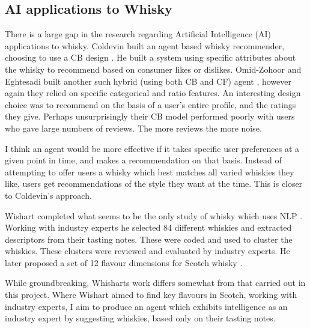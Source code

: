 \subsection{AI applications to Whisky}\label{ssec:ml2whisk}

There is a large gap in the research regarding Artificial Intelligence (AI) applications to whisky.
Coldevin built an agent based whisky recommender, choosing to use a CB design \cite{Coldevin2005}.  He 
built a system using specific attributes about the whisky to recommend based
on consumer likes or dislikes. Omid-Zohoor and Eghtesadi built another such hybrid (using both CB and CF) 
agent \cite{Omidzohoor}, however again they relied on specific categorical and ratio features.
An interesting design choice was to recommend on the basis of a user's entire profile, and the 
ratings they give.  Perhaps unsurprisingly their CB model performed poorly with users who gave large 
numbers of reviews. The more reviews the more noise.

I think an agent would be more effective if it takes specific user preferences
at a given point in time, and makes a recommendation on that basis.  Instead of attempting
to offer users a whisky which best matches all varied whiskies they like, users get
recommendations of the style they want at the time.  This is 
closer to Coldevin's approach.

Wishart completed what seems to be the only study of whisky which uses NLP \cite{Wishart2000}.
Working with industry experts he selected 84 different whiskies and extracted descriptors from their tasting notes. 
These were coded and used to cluster the whiskies. These clusters were reviewed and evaluated by 
industry experts.  He later proposed a set of 12 flavour dimensions for Scotch whisky \cite{Wishart2009}.

While groundbreaking, Whisharts work differs somewhat from that carried out in this project.  Where Wishart aimed to find
key flavours in Scotch, working with industry experts, I aim to produce an agent which exhibits intelligence as an 
industry expert by suggesting whiskies, based only on their tasting notes.

